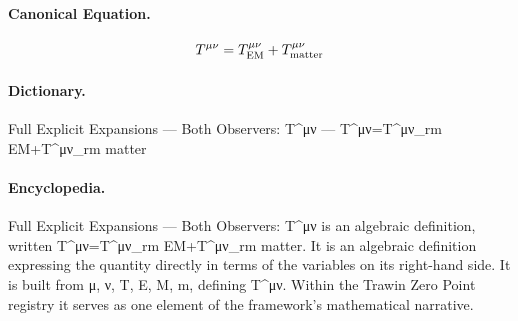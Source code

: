 \paragraph{Canonical Equation.}
\[
T^{\mu\nu}=T^{\mu\nu}_{\rm EM}+T^{\mu\nu}_{\rm matter}
\]

\paragraph{Dictionary.}
Full Explicit Expansions — Both Observers: T\textasciicircum{}μν — T\textasciicircum{}μν=T\textasciicircum{}μν\_rm EM+T\textasciicircum{}μν\_rm matter

\paragraph{Encyclopedia.}
Full Explicit Expansions — Both Observers: T\textasciicircum{}μν is an algebraic definition, written T\textasciicircum{}μν=T\textasciicircum{}μν\_rm EM+T\textasciicircum{}μν\_rm matter. It is an algebraic definition expressing the quantity directly in terms of the variables on its right-hand side. It is built from μ, ν, T, E, M, m, defining T\textasciicircum{}μν. Within the Trawin Zero Point registry it serves as one element of the framework's mathematical narrative.
